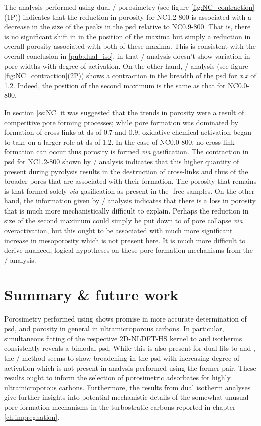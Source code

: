 The analysis performed using dual / porosimetry (see figure \ref{fig:NC_contraction}(1P)) indicates that the reduction in porosity for NC1.2-800 is associated with a decrease in the size of the peaks in the \acrshort{psd} relative to NC0.9-800. That is, there is no significant shift in in the position of the maxima but simply a reduction in overall porosity associated with both of these maxima. This is consistent with the overall conclusion in \ref{pub:dual_iso}, in that / analysis doesn't show variation in pore widths with degree of activation. On the other hand, / analysis (see figure \ref{fig:NC_contraction}(2P)) shows a contraction in the breadth of the \acrshort{psd} for \textit{x.x} of 1.2. Indeed, the position of the second maximum is the same as that for NC0.0-800. 

In section \ref{ss:NC} it was suggested that the trends in porosity were a result of competitive pore forming processes; while pore formation was dominated by formation of cross-links at \acrshort{ds} of 0.7 and 0.9, oxidative chemical activation began to take on a larger role at \acrshort{ds} of 1.2. In the case of NC0.0-800, no cross-link formation can occur thus porosity is formed \textit{via} gasification. The contraction in \acrshort{psd} for NC1.2-800 shown by / analysis indicates that this higher quantity of  present during \gls{pyrolysis} results in the destruction of cross-links and thus of the broader pores that are associated with their formation. The porosity that remains is that formed solely \textit{via} gasification as present in the -free samples. On the other hand, the information given by / analysis indicates that there is a loss in porosity that is much more mechanistically difficult to explain. Perhaps the reduction in size of the second maximum could simply be put down to of pore collapse \textit{via} overactivation, but this ought to be associated with much more significant increase in mesoporosity which is not present here. It is much more difficult to derive nuanced, logical hypotheses on these pore formation mechanisms from the / analysis.

\section{Summary \& future work}
Porosimetry performed using  shows promise in more accurate determination of \acrshort{psd}, and porosity in general in ultramicroporous carbons. In particular, simultaneous fitting of the respective 2D-NLDFT-HS kernel to  and  isotherms consistently reveals a bimodal \acrshort{psd}. While this is also present for dual fits to  and , the / method seems to show broadening in the \acrshort{psd} with increasing degree of activation which is not present in analysis performed using the former pair. These results ought to inform the selection of porosimetric \glspl{adsorbate} for highly ultramicroporous carbons. Furthermore, the results from dual isotherm analyses give further insights into potential mechanistic details of the somewhat unusual pore formation mechanisms in the \glspl{turbostratic carbon} reported in chapter \ref{ch:impregnation}. 

